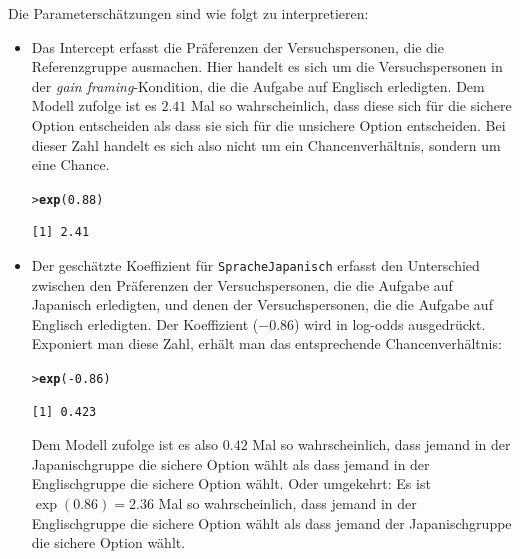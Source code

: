 \documentclass[oneside, 10pt]{book}\usepackage[]{graphicx}\usepackage[]{xcolor}
\makeatletter
\newcommand{\hlnum}[1]{\textcolor[rgb]{0.686,0.059,0.569}{#1}}%
\newcommand{\hlopt}[1]{\textcolor[rgb]{0,0,0}{#1}}%
\newcommand{\hlstd}[1]{\textcolor[rgb]{0.345,0.345,0.345}{#1}}%
\newcommand{\hlkwd}[1]{\textcolor[rgb]{0.737,0.353,0.396}{\textbf{#1}}}%
\newenvironment{kframe}{%
 \def\at@end@of@kframe{}%
 \ifinner\ifhmode%
  \def\at@end@of@kframe{\end{minipage}}%
  \begin{minipage}{\columnwidth}%
 \fi\fi%
 \def\FrameCommand##1{\hskip\@totalleftmargin \hskip-\fboxsep
 \colorbox{shadecolor}{##1}\hskip-\fboxsep
     \hskip-\linewidth \hskip-\@totalleftmargin \hskip\columnwidth}%
 \MakeFramed {\advance\hsize-\width
   \@totalleftmargin\z@ \linewidth\hsize
   \@setminipage}}%
 {\par\unskip\endMakeFramed%
 \at@end@of@kframe}
\newenvironment{knitrout}{}{} %
\makeatother
\begin{document}
Die Parameterschätzungen sind wie folgt zu interpretieren:
\begin{itemize}
 \item Das Intercept erfasst die Präferenzen der Versuchspersonen,
 die die Referenzgruppe ausmachen. Hier handelt es sich um die Versuchspersonen
 in der \textit{gain framing}-Kondition, die die Aufgabe auf Englisch erledigten.
 Dem Modell zufolge ist es $2.41$ Mal so wahrscheinlich, dass diese
 sich für die sichere Option entscheiden als dass sie sich für die unsichere
 Option entscheiden. Bei dieser Zahl handelt es sich also nicht um
 ein Chancenverhältnis, sondern um eine Chance.
\begin{knitrout}
\color{fgcolor}\begin{kframe}
\begin{alltt}
\hlstd{> }\hlkwd{exp}\hlstd{(}\hlnum{0.88}\hlstd{)}
\end{alltt}
\begin{verbatim}
[1] 2.41
\end{verbatim}
\end{kframe}
\end{knitrout}

  \item Der geschätzte Koeffizient für \texttt{SpracheJapanisch}
  erfasst den Unterschied zwischen den Präferenzen der Versuchspersonen,
  die die Aufgabe auf Japanisch erledigten, und denen der Versuchspersonen,
  die die Aufgabe auf Englisch erledigten. Der Koeffizient ($-0.86$) wird
  in log-odds ausgedrückt. Exponiert man diese Zahl, erhält man das entsprechende
  Chancenverhältnis:
\begin{knitrout}
\color{fgcolor}\begin{kframe}
\begin{alltt}
\hlstd{> }\hlkwd{exp}\hlstd{(}\hlopt{-}\hlnum{0.86}\hlstd{)}
\end{alltt}
\begin{verbatim}
[1] 0.423
\end{verbatim}
\end{kframe}
\end{knitrout}
  Dem Modell zufolge ist es also $0.42$ Mal so wahrscheinlich,
  dass jemand in der Japanischgruppe die sichere Option wählt
  als dass jemand in der Englischgruppe die sichere Option wählt.
  Oder umgekehrt: Es ist $\exp(0.86) = 2.36$ Mal so wahrscheinlich, dass
  jemand in der Englischgruppe die sichere Option wählt als
  dass jemand der Japanischgruppe die sichere Option wählt.


\end{itemize}
\end{document}
